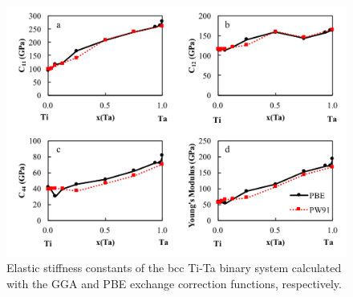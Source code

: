 \pagebreak
\begin{figure}[H]
	\centering
	\includegraphics[width=\textwidth]{Chapter-2/Figures/PBEvsPW91.png}
	\caption{Elastic stiffness constants of the bcc Ti-Ta binary system calculated with the GGA and PBE exchange correction functions, respectively.}
	\label{Ch2-figure:PBEvsPW91}
\end{figure}
